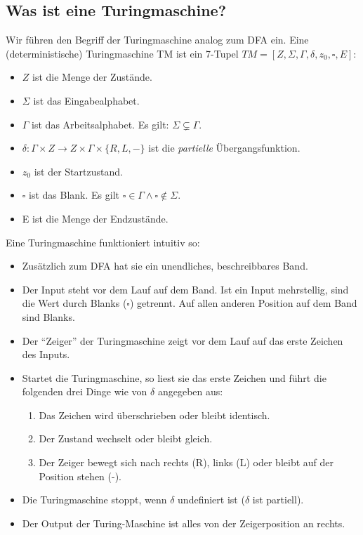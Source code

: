 \subsection{Was ist eine Turingmaschine?}

Wir führen den Begriff der Turingmaschine analog zum DFA ein.
Eine (deterministische) Turingmaschine TM ist ein 7-Tupel
$TM = [Z, \Sigma, \Gamma, \delta, z_0, \square, E]$:
\begin{itemize}
    \item $Z$ ist die Menge der Zustände.
    \item $\Sigma$ ist das Eingabealphabet.
    \item $\Gamma$ ist das Arbeitsalphabet. Es gilt: $\Sigma \subsetneq \Gamma$.
    \item $\delta: \Gamma \times Z \rightarrow Z \times \Gamma \times \{R,L,-\}$
        ist die \emph{partielle} Übergangsfunktion.
    \item $z_0$ ist der Startzustand.
    \item $\square$ ist das Blank.
        Es gilt $\square \in \Gamma \wedge \square \notin \Sigma$.
    \item E ist die Menge der Endzustände.
\end{itemize}

\noindent
Eine Turingmaschine funktioniert intuitiv so:
\begin{itemize}
    \item Zusätzlich zum DFA hat sie ein unendliches, beschreibbares Band.
    \item Der Input steht vor dem Lauf auf dem Band.
        Ist ein Input mehrstellig, sind die Wert durch Blanks ($\square$) getrennt.
        Auf allen anderen Position auf dem Band sind Blanks.
    \item Der ``Zeiger'' der Turingmaschine zeigt vor dem Lauf auf das erste Zeichen des Inputs.
    \item Startet die Turingmaschine,
        so liest sie das erste Zeichen
        und führt die folgenden drei Dinge wie von $\delta$ angegeben aus:
        \begin{enumerate}
            \item Das Zeichen wird überschrieben oder bleibt identisch.
            \item Der Zustand wechselt oder bleibt gleich.
            \item Der Zeiger bewegt sich nach
                rechts (R),
                links (L)
                oder bleibt auf der Position stehen (-).
        \end{enumerate}
    \item Die Turingmaschine stoppt,
        wenn $\delta$ undefiniert ist ($\delta$ ist partiell).
    \item Der Output der Turing-Maschine ist alles von der Zeigerposition an rechts.
\end{itemize}

